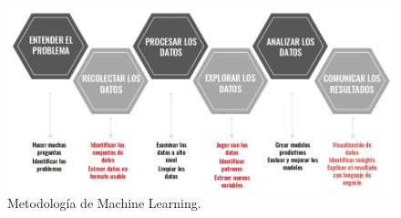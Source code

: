 \documentclass[../main.tex]{subfiles}
\begin{document}
    \begin{figure}[htb]
        \centering
        \includegraphics[scale=0.4]{./images/machine.jpg}
        \caption{Metodología de Machine Learning.}
        \label{fig:figura1}
    \end{figure}
\end{document}
